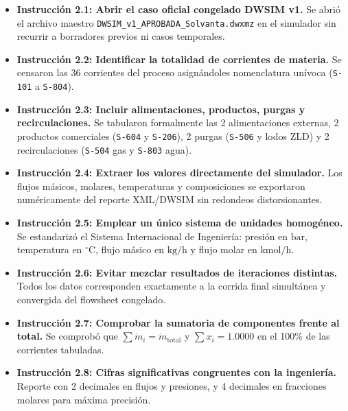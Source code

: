 \documentclass[11pt,letterpaper]{article}
\begin{document}
\begin{itemize}[itemsep=0.5pt,topsep=1pt,parsep=0pt,leftmargin=1.5em]
    \item[{\color{forestgreen}\textbf{[\checkmark]}}] \textbf{Instrucción 2.1: Abrir el caso oficial congelado DWSIM v1.} Se abrió el archivo maestro \texttt{DWSIM\_v1\_APROBADA\_Solvanta.dwxmz} en el simulador sin recurrir a borradores previos ni casos temporales.
    \item[{\color{forestgreen}\textbf{[\checkmark]}}] \textbf{Instrucción 2.2: Identificar la totalidad de corrientes de materia.} Se censaron las 36 corrientes del proceso asignándoles nomenclatura unívoca (\texttt{S-101} a \texttt{S-804}).
    \item[{\color{forestgreen}\textbf{[\checkmark]}}] \textbf{Instrucción 2.3: Incluir alimentaciones, productos, purgas y recirculaciones.} Se tabularon formalmente las 2 alimentaciones externas, 2 productos comerciales (\texttt{S-604} y \texttt{S-206}), 2 purgas (\texttt{S-506} y lodos ZLD) y 2 recirculaciones (\texttt{S-504} gas y \texttt{S-803} agua).
    \item[{\color{forestgreen}\textbf{[\checkmark]}}] \textbf{Instrucción 2.4: Extraer los valores directamente del simulador.} Los flujos másicos, molares, temperaturas y composiciones se exportaron numéricamente del reporte XML/DWSIM sin redondeos distorsionantes.
    \item[{\color{forestgreen}\textbf{[\checkmark]}}] \textbf{Instrucción 2.5: Emplear un único sistema de unidades homogéneo.} Se estandarizó el Sistema Internacional de Ingeniería: presión en $\text{bar}$, temperatura en $^\circ\text{C}$, flujo másico en $\text{kg/h}$ y flujo molar en $\text{kmol/h}$.
    \item[{\color{forestgreen}\textbf{[\checkmark]}}] \textbf{Instrucción 2.6: Evitar mezclar resultados de iteraciones distintas.} Todos los datos corresponden exactamente a la corrida final simultánea y convergida del flowsheet congelado.
    \item[{\color{forestgreen}\textbf{[\checkmark]}}] \textbf{Instrucción 2.7: Comprobar la sumatoria de componentes frente al total.} Se comprobó que $\sum \dot{m}_i = \dot{m}_{\text{total}}$ y $\sum x_i = 1.0000$ en el 100\% de las corrientes tabuladas.
    \item[{\color{forestgreen}\textbf{[\checkmark]}}] \textbf{Instrucción 2.8: Cifras significativas congruentes con la ingeniería.} Reporte con 2 decimales en flujos y presiones, y 4 decimales en fracciones molares para máxima precisión.
\end{itemize}
\end{document}
